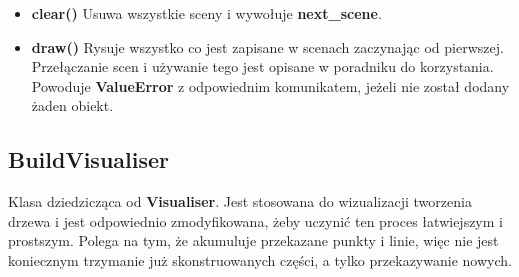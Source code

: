 \documentclass[a4paper, 12pt]{article}
\begin{document}
\begin{itemize}
          \item \textbf{clear()} \vspace{6pt}\newline
          \quad Usuwa wszystkie sceny i wywołuje \textbf{next\_scene}.
          \vspace{6pt}
          
          \item \textbf{draw()} \vspace{6pt}\newline
          \quad Rysuje wszystko co jest zapisane w scenach zaczynając od pierwszej. Przełączanie scen i używanie tego jest opisane w poradniku do korzystania. Powoduje \textbf{ValueError} z odpowiednim komunikatem, jeżeli nie został dodany żaden obiekt.
          
      \end{itemize}

    \subsection{BuildVisualiser}
      \quad Klasa dziedzicząca od \textbf{Visualiser}. Jest stosowana do wizualizacji tworzenia drzewa i jest odpowiednio zmodyfikowana, żeby uczynić ten proces łatwiejszym i prostszym. Polega na tym, że akumuluje przekazane punkty i linie, więc nie jest koniecznym trzymanie już skonstruowanych części, a tylko przekazywanie nowych.
\end{document}

